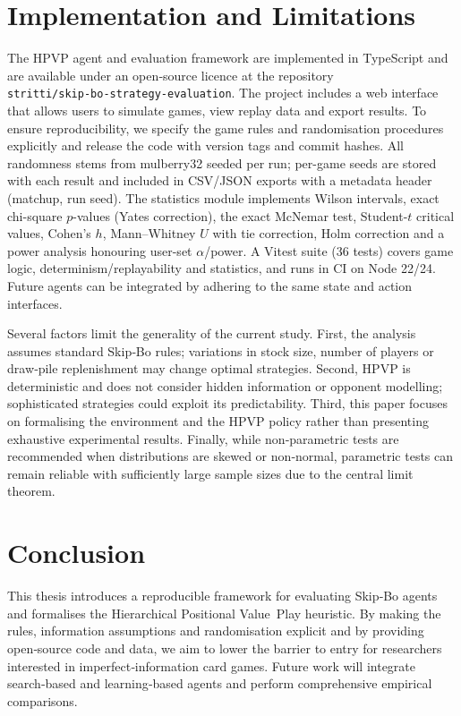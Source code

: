 \documentclass[twoside]{mitthesis}
\begin{document}
\chapter{Implementation and Limitations}
The HPVP agent and evaluation framework are implemented in TypeScript and are available under an open‑source licence at the repository \texttt{stritti/skip‑bo‑strategy‑evaluation}.  The project includes a web interface that allows users to simulate games, view replay data and export results.  To ensure reproducibility, we specify the game rules and randomisation procedures explicitly and release the code with version tags and commit hashes. All randomness stems from mulberry32 seeded per run; per-game seeds are stored with each result and included in CSV/JSON exports with a metadata header (matchup, run seed). The statistics module implements Wilson intervals, exact chi-square $p$-values (Yates correction), the exact McNemar test, Student-$t$ critical values, Cohen's $h$, Mann–Whitney $U$ with tie correction, Holm correction and a power analysis honouring user-set $\alpha$/power. A Vitest suite (36 tests) covers game logic, determinism/replayability and statistics, and runs in CI on Node 22/24.  Future agents can be integrated by adhering to the same state and action interfaces.

Several factors limit the generality of the current study.  First, the analysis assumes standard Skip‑Bo rules; variations in stock size, number of players or draw‑pile replenishment may change optimal strategies.  Second, HPVP is deterministic and does not consider hidden information or opponent modelling; sophisticated strategies could exploit its predictability.  Third, this paper focuses on formalising the environment and the HPVP policy rather than presenting exhaustive experimental results.  Finally, while non‑parametric tests are recommended when distributions are skewed or non‑normal, parametric tests can remain reliable with sufficiently large sample sizes due to the central limit theorem.

\chapter{Conclusion}
This thesis introduces a reproducible framework for evaluating Skip‑Bo agents and formalises the Hierarchical Positional Value Play heuristic.  By making the rules, information assumptions and randomisation explicit and by providing open‑source code and data, we aim to lower the barrier to entry for researchers interested in imperfect‑information card games.  Future work will integrate search‑based and learning‑based agents and perform comprehensive empirical comparisons.
\end{document}
